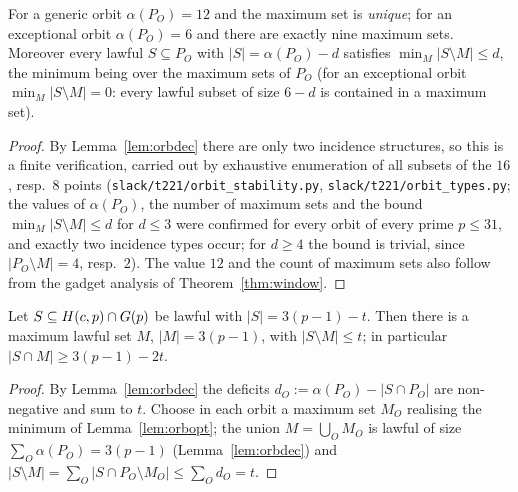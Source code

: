 \begin{lemma}\label{lem:orbopt}
For a generic orbit $\alpha(P_O)=12$ and the maximum set is \emph{unique}; for an exceptional orbit $\alpha(P_O)=6$ and there are exactly
nine maximum sets.  Moreover every lawful $S\subseteq P_O$ with $|S|=\alpha(P_O)-d$ satisfies $\min_M|S\setminus M|\le d$, the minimum
being over the maximum sets of $P_O$ (for an exceptional orbit $\min_M|S\setminus M|=0$: every lawful subset of size $6-d$ is contained in
a maximum set).
\end{lemma}
\begin{proof}
By Lemma~\ref{lem:orbdec} there are only two incidence structures, so this is a finite verification, carried out by exhaustive enumeration
of all subsets of the $16$, resp.\ $8$ points (\texttt{slack/\allowbreak t221/\allowbreak orbit\_\allowbreak stability.py}, \texttt{slack/\allowbreak t221/\allowbreak orbit\_\allowbreak types.py}; the values of
$\alpha(P_O)$, the number of maximum sets and the bound $\min_M|S\setminus M|\le d$ for $d\le3$ were confirmed for every orbit of every
prime $p\le31$, and exactly two incidence types occur; for $d\ge4$ the bound is trivial, since $|P_O\setminus M|=4$, resp.\ $2$).
The value $12$ and the count of maximum sets also follow from the gadget analysis of Theorem~\ref{thm:window}.
\end{proof}

\begin{proposition}[stability]\label{prop:stability}
Let $S\subseteq H(c,p)\cap G(p)$ be lawful with $|S|=3(p-1)-t$.  Then there is a maximum lawful set $M$,
$|M|=3(p-1)$, with $|S\setminus M|\le t$; in particular $|S\cap M|\ge3(p-1)-2t$.
\end{proposition}
\begin{proof}
By Lemma~\ref{lem:orbdec} the deficits $d_O:=\alpha(P_O)-|S\cap P_O|$ are non-negative and sum to $t$.  Choose in each orbit a maximum
set $M_O$ realising the minimum of Lemma~\ref{lem:orbopt}; the union $M=\bigcup_OM_O$ is lawful of size $\sum_O\alpha(P_O)=3(p-1)$
(Lemma~\ref{lem:orbdec}) and $|S\setminus M|=\sum_O|S\cap P_O\setminus M_O|\le\sum_Od_O=t$.
\end{proof}

